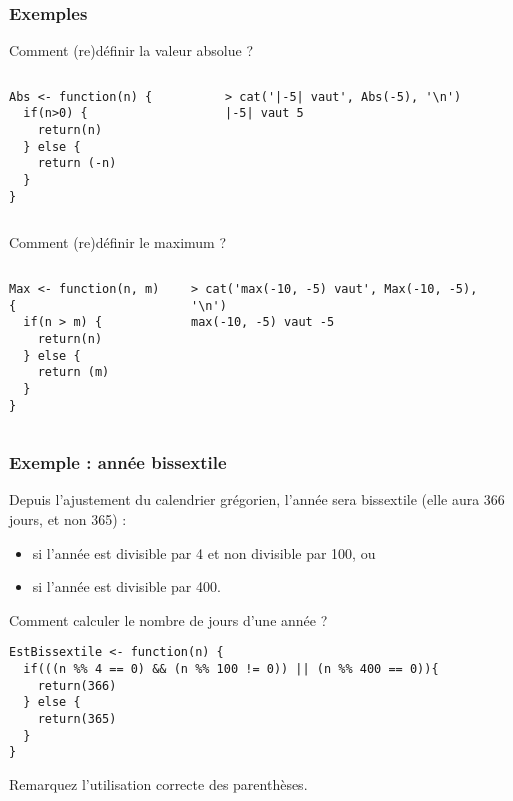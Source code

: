 \documentclass[10pt]{beamer}
\begin{document}
\begin{frame}[fragile]
  \frametitle{Exemples}

  \begin{exampleblock}{Comment (re)définir la valeur absolue ?}
\begin{columns}[c]
\begin{column}{0.4\textwidth}
  \begin{lstlisting}[style=edblock]
Abs <- function(n) {
  if(n>0) {
    return(n)
  } else {
    return (-n)
  }
}
\end{lstlisting}
\end{column}
\begin{column}{0.6\textwidth}
  \begin{lstlisting}
> cat('|-5| vaut', Abs(-5), '\n')
|-5| vaut 5    
  \end{lstlisting}
\end{column}
\end{columns}
\end{exampleblock}

  \begin{exampleblock}{Comment (re)définir le maximum ?}
\begin{columns}[c]
\begin{column}{0.4\textwidth}
  \begin{lstlisting}[style=edblock]
Max <- function(n, m) {
  if(n > m) {
    return(n)
  } else {
    return (m)
  }
}
\end{lstlisting}
\end{column}
\begin{column}{0.6\textwidth}
  \begin{lstlisting}
> cat('max(-10, -5) vaut', Max(-10, -5), '\n')
max(-10, -5) vaut -5    
\end{lstlisting}
\end{column}
\end{columns}
  \end{exampleblock}


\end{frame}

\begin{frame}[fragile]
  \frametitle{Exemple : année bissextile}
  Depuis l'ajustement du calendrier grégorien, l'année sera bissextile (elle aura 366 jours, et non 365) :
  \begin{itemize}
  \item si l'année est divisible par 4 et non divisible par 100, ou
  \item si l'année est divisible par 400.
  \end{itemize}
  \begin{exampleblock}{Comment calculer le nombre de jours d'une année  ?}
    
 
  \begin{lstlisting}[style=edblock]
EstBissextile <- function(n) {
  if(((n %% 4 == 0) && (n %% 100 != 0)) || (n %% 400 == 0)){
    return(366)
  } else {
    return(365)
  }
}
\end{lstlisting}
Remarquez l'utilisation correcte des parenthèses.
\end{exampleblock}
\end{frame}
\end{document}
